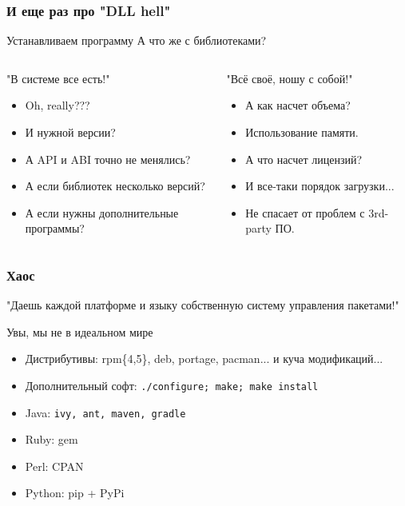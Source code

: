 \begin{frame}
	\frametitle{И еще раз про "DLL hell"}
	
	\begin{block}{Устанавливаем программу}
	А что же с библиотеками?
	\end{block}

	\pause

	\begin{columns}
		\begin{block}{"В системе все есть!"}
		\begin{itemize}
			\item Oh, really???
			\item И нужной версии?
			\item А API и ABI точно не менялись?
			\item А если библиотек несколько версий?
			\item А если нужны дополнительные программы?
		\end{itemize}
		\end{block}
		\pause
		\begin{block}{"Всё своё, ношу с собой!"}
		\begin{itemize}
			\item А как насчет объема?
			\item Использование памяти.
			\item А что насчет лицензий?
			\item И все-таки порядок загрузки...
			\item Не спасает от проблем с 3rd-party ПО.
		\end{itemize}
		\end{block}
	\end{columns}
\end{frame}

\begin{frame}
	\frametitle{Хаос}

	\begin{center}
		"Даешь каждой платформе и языку собственную систему управления пакетами!"
	\end{center}

	\begin{block}{Увы, мы не в идеальном мире}
		\begin{itemize}
			\item Дистрибутивы: rpm\{4,5\}, deb, portage, pacman... и куча модификаций...
			\item Дополнительный софт: {\tt ./configure; make; make install}
			\item Java: {\tt ivy, ant, maven, gradle}
			\item Ruby: gem
			\item Perl: CPAN
			\item Python: pip + PyPi
		\end{itemize}
	\end{block}

\end{frame}

